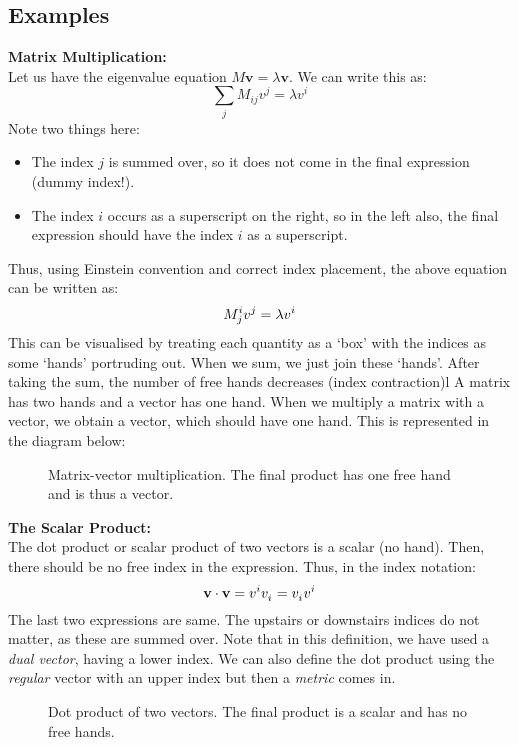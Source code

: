  \subsection{Examples}
 \textbf{Matrix Multiplication:}\\[0.3cm]
 Let us have the eigenvalue equation $M\mathbf{v} = \lambda\mathbf{v}$. We can write this as: 
 $$\sum\limits_j M_{ij}v^j = \lambda v^i$$
 Note two things here: 
 \begin{itemize}
    \item The index $j$ is summed over, so it does not come in the final expression (dummy index!).
    \item The index $i$ occurs as a superscript on the right, so in the left also, the final expression should have the index $i$ as a superscript.
 \end{itemize}
 Thus, using Einstein convention and correct index placement, the above equation can be written as:
$$M\indices*{^i_j}v\indices{^j} = \lambda v\indices{^i}$$
This can be visualised by treating each quantity as a `box' with the indices as some `hands' portruding out. When we sum, we just join these `hands'. After taking the sum, the number of free hands decreases (index contraction)l A matrix has two hands and a vector has one hand. When we multiply a matrix with a vector, we obtain a vector, which should have one hand. This is represented in the diagram below:
\begin{figure}[H]
    \centering
    
    \caption{Matrix-vector multiplication. The final product has one free hand and is thus a vector.}
\end{figure}
\noindent
\textbf{The Scalar Product:}\\[0.3cm]
The dot product or scalar product of two vectors is a scalar (no hand). Then, there should be no free index in the expression. Thus, in the index notation:
$$\mathbf{v}\cdot \mathbf{v} = v\indices{^i}v\indices{_i} =v\indices{_i}v\indices{^i}  $$
The last two expressions are same. The upstairs or downstairs indices do not matter, as these are summed over. Note that in this definition, we have used a \textit{dual vector}, having a lower index. We can also define the dot product using the \textit{regular} vector with an upper index but then a \textit{metric} comes in.
\begin{figure}[H]
    \centering
    
    \caption{Dot product of two vectors. The final product is a scalar and has no free hands.}
\end{figure}
